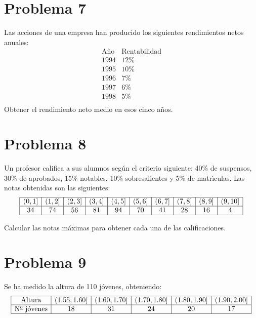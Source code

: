\documentclass[hidequestions]{homework}
\begin{document}
	\section{Problema 7}
	\color{blue}
	Las acciones de una empresa han producido los  siguientes  rendimientos
	netos anuales:
	$$
	\begin{array}{cc}
	\mbox{A{\~n}o} & \mbox{Rentabilidad} \\ \hline
	1994  &        12\%     \\
	1995  &        10\%     \\
	1996  &         7\%     \\
	1997  &         6\%     \\
	1998  &         5\%     \\
	\end{array}
	$$
	Obtener el rendimiento neto medio en esos cinco a{\~n}os. \\
	\color{black}
	
	
	
	
	\section{Problema 8}
	\color{blue}
	Un profesor califica a sus alumnos seg{\'u}n el criterio siguiente: 40\%  de
	suspensos, 30\% de aprobados, 15\% notables, 10\% sobresalientes y  5\%  de
	matr{\'\i}culas. Las notas obtenidas son las si\-guien\-tes:
	$$
	\begin{array}{|c|c|c|c|c|c|c|c|c|c|} \hline
	(0,1] & (1,2] & (2,3] & (3,4] & (4,5] & (5,6] & (6,7] & (7,8] & (8,9] & (9,10] \\ \hline
	34 & 74  & 56  &  81 &  94 &  70 &  41 &  28 &  16 &  4  \\ \hline
	\end{array}
	$$
	
	Calcular las notas m{\'a}ximas para obtener cada una de las calificaciones. \\
	
	\color{black}
	
	
	
	
	\section{Problema 9}
	\color{blue}
	Se ha medido la altura de 110 j{\'o}venes, obteniendo:
	$$
	\begin{array}{|c|c|c|c|c|c|c|c|c|c|} \hline
	\mbox{Altura}     & (1\mbox{.}55,1\mbox{.}60] &
	(1\mbox{.}60,1\mbox{.}70] & (1\mbox{.}70,1\mbox{.}80] &
	(1\mbox{.}80,1\mbox{.}90] & (1\mbox{.}90,2\mbox{.}00] \\ \hline
	\mbox{N${}^{\underline{o}}$ j{\'o}venes} & 18 & 31     &  24       &
	20    &  17  \\ \hline
	\end{array}
	$$
	
\end{document}
